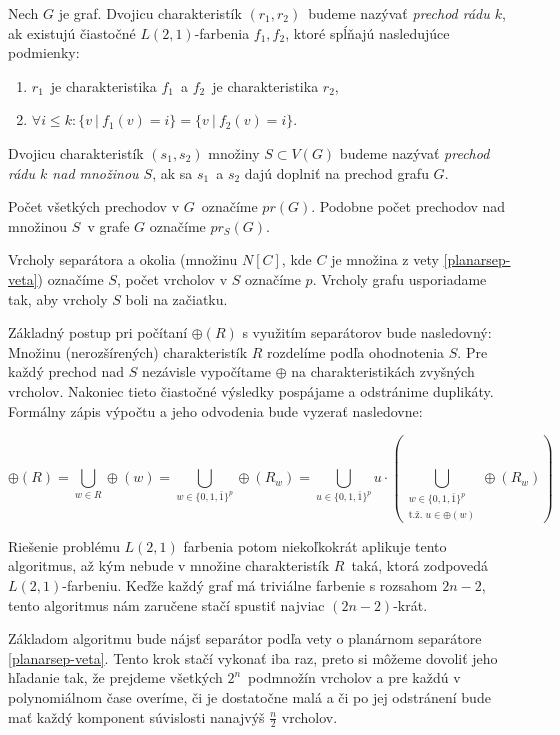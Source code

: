 \begin{defn}
    Nech $G$ je graf. Dvojicu charakteristík $(r_1, r_2)$ budeme nazývať \emph{prechod rádu $k$}, ak existujú
    čiastočné $L(2,1)$-farbenia $f_1, f_2$, ktoré spĺňajú nasledujúce podmienky:
    \begin{enumerate}
        \item $r_1$ je charakteristika $f_1$ a $f_2$ je charakteristika $r_2$,
        \item $\forall i \leq k : \{v \ |\ f_1(v) = i\} = \{v \ |\ f_2(v) = i\}$.
    \end{enumerate}

    Dvojicu charakteristík $(s_1, s_2)$ množiny $S \subset V(G)$ budeme nazývať \emph{prechod rádu $k$ nad množinou $S$}, ak
    sa $s_1$ a $s_2$ dajú doplniť na prechod grafu $G$.

    Počet všetkých prechodov v $G$ označíme $pr(G)$. Podobne počet prechodov nad množinou $S$ v grafe $G$
    označíme $pr_S(G)$.
\end{defn}

Vrcholy separátora a okolia (množinu $N[C]$, kde $C$ je množina z vety \ref{planarsep-veta})
označíme $S$, počet vrcholov v $S$ označíme $p$. Vrcholy grafu usporiadame tak, aby vrcholy $S$ boli na začiatku.

Základný postup pri počítaní $\oplus(R)$ s využitím separátorov bude nasledovný:
Množinu (nerozšírených) charakteristík $R$ rozdelíme podľa ohodnotenia $S$. Pre každý prechod
nad $S$ nezávisle vypočítame $\oplus$ na charakteristikách zvyšných vrcholov. Nakoniec tieto
čiastočné výsledky pospájame a odstránime duplikáty.
Formálny zápis výpočtu a jeho odvodenia bude vyzerať nasledovne:

$$ \oplus(R) = \bigcup \limits_{w \in R} \oplus(w) = \bigcup \limits_{w \in \{0, 1, \bar{1}\}^p} \oplus(R_w) = \bigcup \limits_{u \in \{0, 1, \bar{1}\}^p} u \cdot \left(\bigcup \limits_{\substack{w \in \{0, 1, \bar{1}\}^p\\ \textrm{t.ž. } u \in \oplus(w)}} \oplus(R_w) \right)$$

Riešenie
problému $L(2,1)$ farbenia potom niekoľkokrát aplikuje tento algoritmus, až kým nebude v množine
charakteristík $R$ taká, ktorá zodpovedá $L(2,1)$-farbeniu. Keďže každý graf má triviálne farbenie
s rozsahom $2n - 2$, tento algoritmus nám zaručene stačí spustiť najviac $(2n - 2)$-krát.

Základom algoritmu bude nájsť separátor podľa vety o planárnom separátore \ref{planarsep-veta}. Tento
krok stačí vykonať iba raz, preto si môžeme dovoliť jeho hľadanie tak, že prejdeme všetkých $2^n$ podmnožín
vrcholov a pre každú v polynomiálnom čase overíme, či je dostatočne malá a či po jej odstránení bude mať
každý komponent súvislosti nanajvýš $\frac{n}{2}$ vrcholov.

